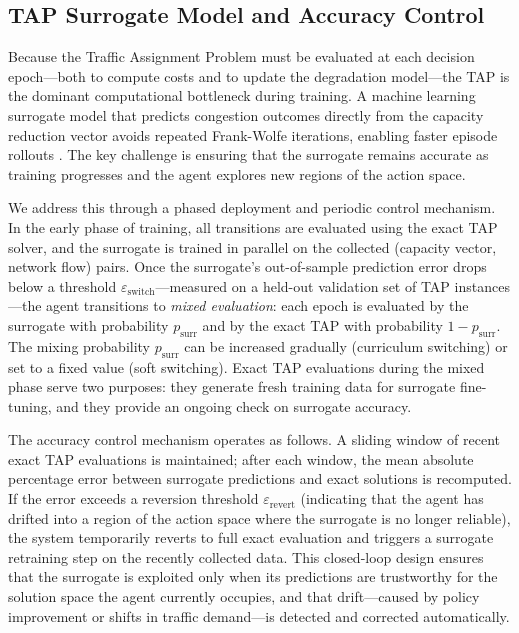 \documentclass[3p, twocolumn]{elsarticle}
\begin{document}
\subsection{TAP Surrogate Model and Accuracy Control}
\label{subsec:surrogate}

Because the Traffic Assignment Problem must be evaluated at each decision epoch---both to compute costs and to update the degradation model---the TAP is the dominant computational bottleneck during training. A machine learning surrogate model that predicts congestion outcomes directly from the capacity reduction vector avoids repeated Frank-Wolfe iterations, enabling faster episode rollouts \citep{boschMachineLearningPredictions2025}. The key challenge is ensuring that the surrogate remains accurate as training progresses and the agent explores new regions of the action space.

We address this through a phased deployment and periodic control mechanism. In the early phase of training, all transitions are evaluated using the exact TAP solver, and the surrogate is trained in parallel on the collected (capacity vector, network flow) pairs. Once the surrogate's out-of-sample prediction error drops below a threshold $\varepsilon_{\text{switch}}$---measured on a held-out validation set of TAP instances---the agent transitions to \emph{mixed evaluation}: each epoch is evaluated by the surrogate with probability $p_{\text{surr}}$ and by the exact TAP with probability $1 - p_{\text{surr}}$. The mixing probability $p_{\text{surr}}$ can be increased gradually (curriculum switching) or set to a fixed value (soft switching). Exact TAP evaluations during the mixed phase serve two purposes: they generate fresh training data for surrogate fine-tuning, and they provide an ongoing check on surrogate accuracy.

The accuracy control mechanism operates as follows. A sliding window of recent exact TAP evaluations is maintained; after each window, the mean absolute percentage error between surrogate predictions and exact solutions is recomputed. If the error exceeds a reversion threshold $\varepsilon_{\text{revert}}$ (indicating that the agent has drifted into a region of the action space where the surrogate is no longer reliable), the system temporarily reverts to full exact evaluation and triggers a surrogate retraining step on the recently collected data. This closed-loop design ensures that the surrogate is exploited only when its predictions are trustworthy for the solution space the agent currently occupies, and that drift---caused by policy improvement or shifts in traffic demand---is detected and corrected automatically.
\end{document}

